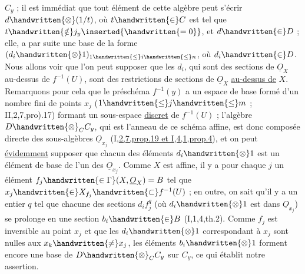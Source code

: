 $C_y$ ; il est immédiat que tout élément de cette algèbre peut s'écrir \margin{\handwritten{$\ast$}}$d\handwritten{\otimes}(1/t)$, où $t\handwritten{\in}C$  est tel que $t\handwritten{\notin}j_y\inserted{\handwritten{=0}}$, et $d\handwritten{\in}D$ ; elle, a par suite une base de la forme $(d_i\handwritten{\otimes}1)_{1\handwritten{\leq}i\handwritten{\leq}n}$, où $d_i\handwritten{\in}D$. Nous allons voir que l'on peut supposer que les $d_i$, qui sont des sections de $\underline O_X$ au-dessus de $f^{-1}(U)$, sont des restrictions de sections de $\underline O_X$ \uline{au-dessus de} $X$. Remarquons pour cela que le préschéma $f^{-1}(y)$ a un espace de base formé d'un nombre fini de points $x_j$ ($1\handwritten{\leq}j\handwritten{\leq}m$ ; II,2,7,pro).17) formant un sous-espace \uline{discret} de $f^{-1}(U)$ ; l'algèbre  $D\handwritten{\otimes}_C C_y$, qui est l'anneau de ce schéma affine, est donc composée directe des sous-algèbres $\underline O_{x_j}$ (I,\uline{2,7,prop.19 et I,4,1,prop.4}), \margin{\handwritten{!}}et on peut \uline{évidemment} supposer que chacun des éléments $d_i\handwritten{\otimes}1$ est un élément de base
de l'un des $\underline O_{x_j}$. Comme $X$ est affine, il y a pour chaque $j$ un élément $f_j\handwritten{\in\Gamma}(X,\underline O_X)=B$ tel que $x_j\handwritten{\in}X_{f_j}\handwritten{\subset}f^{-1}(U)$  ; en outre, on sait qu'il y a un entier $q$ tel que chacune des sections $d_i f_j^q$ (où $d_i\handwritten{\otimes}1$ est dans $\underline O_{x_j}$) se prolonge en une section $b_i\handwritten{\in}B$ (I,1,4,th.2). Comme $f_j$ est inversible au point $x_j$ et que les $d_i\handwritten{\otimes}1$ correspondant à $x_j$ sont nulles aux $x_k\handwritten{\ne}x_j$, les éléments $b_i\handwritten{\otimes}1$ forment encore une base de $D\handwritten{\otimes}_C C_y$ sur $C_y$, ce qui établit notre assertion.

